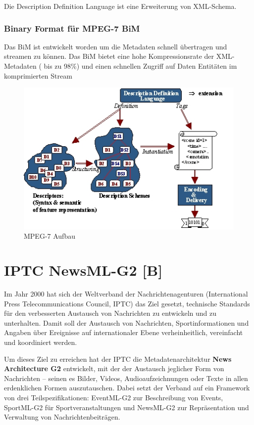 	Die Description Definition Language ist eine Erweiterung von XML-Schema.

\subsubsection{Binary Format für MPEG-7 BiM}

Das BiM ist entwickelt worden um die Metadaten schnell übertragen und streamen zu können. Das BiM bietet eine hohe Kompressionsrate der XML-Metadaten ( bis zu 98\%) und einen schnellen Zugriff auf Daten Entitäten im komprimierten Stream

\begin{figure}[h]
	\includegraphics [scale=0.55]{image004.jpg}
	\caption {MPEG-7 Aufbau}
\end{figure}

	\section{IPTC NewsML-G2 [B]}
	Im Jahr 2000 hat sich der Weltverband der Nachrichtenagenturen (International Press Telecommunications Council, IPTC) das Ziel gesetzt, technische Standards für den verbesserten Austausch von Nachrichten zu entwickeln und zu unterhalten. Damit soll der Austausch von Nachrichten, Sportinformationen und Angaben über Ereignisse auf internationaler Ebene verheinheitlich, vereinfacht und koordiniert werden.
	
	Um dieses Ziel zu erreichen hat der IPTC die Metadatenarchitektur \textbf{News Architecture G2} entwickelt, mit der der Austausch jeglicher Form von Nachrichten -- seinen es Bilder, Videos, Audioaufzeichnungen oder Texte in allen erdenklichen Formen auszutauschen. Dabei setzt der Verband auf ein Framework von drei Teilspezifikationen: EventML-G2 zur Beschreibung von Events, SportML-G2 für Sportveranstaltungen und NewsML-G2 zur Repräsentation und Verwaltung von Nachrichtenbeiträgen.
	
